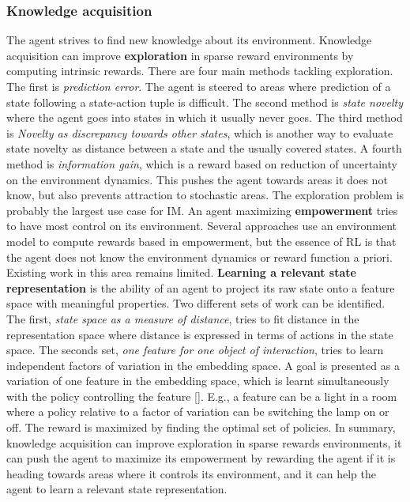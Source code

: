 \documentclass[conference]{IEEEtran}
\begin{document}
\subsubsection{Knowledge acquisition} \label{subsubsec:knowledge_acquisition}
The agent strives to find new knowledge about its environment. Knowledge acquisition can improve \textbf{exploration} in sparse reward environments by computing intrinsic rewards. There are four main methods tackling exploration. The first is \textit{prediction error}. The agent is steered to areas where prediction of a state following a state-action tuple is difficult. The second method is \textit{state novelty} where the agent goes into states in which it usually never goes. The third method is \textit{Novelty as discrepancy towards other states}, which is another way to evaluate state novelty as distance between a state and the usually covered states. A fourth method is \textit{information gain}, which is a reward based on reduction of uncertainty on the environment dynamics. This pushes the agent towards areas it does not know, but also prevents attraction to stochastic areas. The exploration problem is probably the largest use case for IM. An agent maximizing \textbf{empowerment} tries to have most control on its environment. Several approaches use an environment model to compute rewards based in empowerment, but the essence of RL is that the agent does not know the environment dynamics or reward function a priori. Existing work in this area remains limited. \textbf{Learning a relevant state representation} is the ability of an agent to project its raw state  onto a feature space with meaningful properties. Two different sets of work can be identified. The first, \textit{state space as a measure of distance}, tries to fit distance in the representation space where distance is expressed in terms of actions in the state space. The seconds set, \textit{one feature for one object of interaction}, tries to learn independent factors of variation in the embedding space. A goal is presented as a variation of one feature in the embedding space, which is learnt simultaneously with the policy controlling the feature [\cite{thomas2017independently}]. E.g., a feature can be a light in a room where a policy relative to a factor of variation can be switching the lamp on or off. The reward is maximized by finding the optimal set of policies. In summary, knowledge acquisition can improve exploration in sparse rewards environments, it can push the agent to maximize its empowerment by rewarding the agent if it is heading towards areas where it controls its environment, and it can help the agent to learn a relevant state representation.
\end{document}
